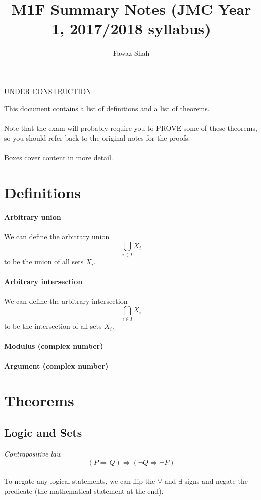 \documentclass{article}
\title{M1F Summary Notes (JMC Year 1, 2017/2018 syllabus)}
\date{}
\author{Fawaz Shah}
\begin{document}
\large
\maketitle
\begin{center}
UNDER CONSTRUCTION
\end{center}
\noindent This document contains a list of definitions and a list of theorems.
\\\\
Note that the exam will probably require you to PROVE some of these theorems, so you should refer back to the original notes for the proofs.
\\\\
Boxes cover content in more detail.
\tableofcontents
\newpage

\section{Definitions}
\paragraph{Arbitrary union}
We can define the arbitrary union
\begin{equation}
\bigcup_{i \in I} X_{i}
\end{equation}
to be the union of all sets $ X_{i} $.
\paragraph{Arbitrary intersection}
We can define the arbitrary intersection
\begin{equation}
\bigcap_{i \in I} X_{i}
\end{equation}
to be the intersection of all sets $ X_{i} $.
\paragraph{Modulus (complex number)}
\paragraph{Argument (complex number)}

\section{Theorems}
\subsection{Logic and Sets}
\textit{Contrapositive law}
\begin{equation}
(P \Rightarrow Q) \Rightarrow (\neg Q \Rightarrow \neg P)
\end{equation}
\\
To negate any logical statements, we can flip the $ \forall $ and $ \exists $ signs and negate the predicate (the mathematical statement at the end).
\end{document}
